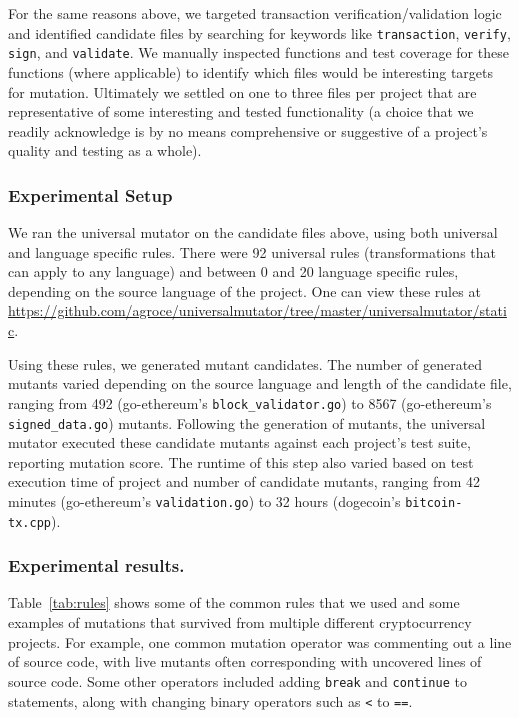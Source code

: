 For the same reasons above, we targeted transaction verification/validation logic and
identified candidate files by searching for keywords like \texttt{transaction},
\texttt{verify}, \texttt{sign}, and \texttt{validate}. We manually inspected
functions and test coverage for these functions (where applicable) to identify
which files would be interesting targets for mutation. Ultimately we
settled on one to three files per project that are representative of some
interesting and tested functionality (a choice that we readily acknowledge is by
no means comprehensive or suggestive of a project's quality and testing as a
whole).

\subsubsection*{Experimental Setup}
We ran the universal mutator on the candidate files above, using both universal and
language specific rules. There were 92 universal rules (transformations that can apply to
any language) and between 0 and 20 language specific rules, depending on the source language
of the project. One can view these rules
at \url{https://github.com/agroce/universalmutator/tree/master/universalmutator/static}.

Using these rules, we generated mutant candidates. The number of generated mutants varied depending
on the source language and length of the candidate file, ranging from
492 (go-ethereum's {\tt block\_validator.go}) to
8567 (go-ethereum's {\tt signed\_data.go}) mutants. Following the generation of mutants, the universal mutator
executed these candidate mutants against each project's test suite, reporting mutation score. The runtime
of this step also varied based on test execution time of project and number of candidate mutants, ranging from
42 minutes (go-ethereum's {\tt validation.go}) to 32 hours (dogecoin's
{\tt bitcoin-tx.cpp}).

\subsubsection*{Experimental results.}

Table~\ref{tab:rules} shows some of the common rules that we used and some examples of mutations that survived
from multiple different cryptocurrency projects. For example, one common mutation operator was commenting out a line
of source code, with live mutants often corresponding with uncovered lines of source code. Some other operators
included adding {\tt break} and {\tt continue} to statements, along with changing binary operators such as \texttt{<} to \texttt{==}.

